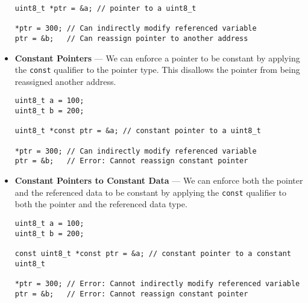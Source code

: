 \documentclass{article}
\begin{document}
\begin{itemize}
\begin{verbatim}
uint8_t *ptr = &a; // pointer to a uint8_t

*ptr = 300; // Can indirectly modify referenced variable
ptr = &b;   // Can reassign pointer to another address
\end{verbatim}
    \item \textbf{Constant Pointers} --- We can enforce a pointer to be
          constant by applying the \texttt{const} qualifier to
          the pointer type. This disallows the pointer from being
          reassigned another address.
          \begin{verbatim}
uint8_t a = 100;
uint8_t b = 200;

uint8_t *const ptr = &a; // constant pointer to a uint8_t

*ptr = 300; // Can indirectly modify referenced variable
ptr = &b;   // Error: Cannot reassign constant pointer
\end{verbatim}
    \item \textbf{Constant Pointers to Constant Data} --- We can enforce
          both the pointer and the referenced data to be constant by
          applying the \texttt{const} qualifier to both the
          pointer and the referenced data type.
          \begin{verbatim}
uint8_t a = 100;
uint8_t b = 200;

const uint8_t *const ptr = &a; // constant pointer to a constant uint8_t

*ptr = 300; // Error: Cannot indirectly modify referenced variable
ptr = &b;   // Error: Cannot reassign constant pointer
\end{verbatim}
\end{itemize}
\end{document}

